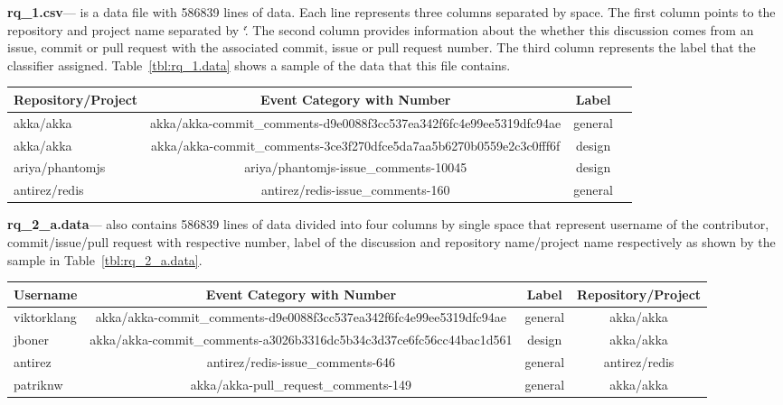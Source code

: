 \noindent\textbf{rq\_1.csv}--- is a data file with 586839 lines of data. Each line represents three columns separated by space. The first column points to the repository and project name separated by `\'. The second column provides information about the whether this discussion comes from an issue, commit or pull request with the associated commit, issue or pull request number. The third column represents the label that the classifier assigned. Table~\ref{tbl:rq_1.data} shows a sample of the data that this file contains.
\begin{table*}
	\centering
	\caption{Data sample in rq\_1.data}
	\label{tbl:rq_1.data}
	\begin{tabular}{lccc} 
		\toprule
		\textbf{Repository/Project} & \textbf{Event Category with Number}  & \textbf{Label}  \\
		\midrule
		akka/akka & akka/akka-commit\_comments-d9e0088f3cc537ea342f6fc4e99ee5319dfc94ae & general \\
		akka/akka & akka/akka-commit\_comments-3ce3f270dfce5da7aa5b6270b0559e2c3c0fff6f & design \\
		ariya/phantomjs & ariya/phantomjs-issue\_comments-10045 & design \\
		antirez/redis & antirez/redis-issue\_comments-160 & general \\
		\bottomrule
	\end{tabular}
\end{table*}

\noindent\textbf{rq\_2\_a.data}--- also contains 586839 lines of data divided into four columns by single space that represent username of the contributor, commit/issue/pull request with respective number, label of the discussion and repository name/project name respectively as shown by the sample in Table~\ref{tbl:rq_2_a.data}.
\begin{table*}
	\centering
	\caption{Data sample in rq\_2\_a.data}
	\label{tbl:rq_2_a.data}
	\begin{tabular}{lccc} 
		\toprule
		\textbf{Username} & \textbf{Event Category with Number}  & \textbf{Label} & \textbf{Repository/Project}  \\
		\midrule
		viktorklang & akka/akka-commit\_comments-d9e0088f3cc537ea342f6fc4e99ee5319dfc94ae & general & akka/akka \\
		jboner & akka/akka-commit\_comments-a3026b3316dc5b34c3d37ce6fc56cc44bac1d561 & design & akka/akka \\
		antirez & antirez/redis-issue\_comments-646 & general & antirez/redis \\
		patriknw & akka/akka-pull\_request\_comments-149 & general & akka/akka \\
		\bottomrule
	\end{tabular}
\end{table*}

